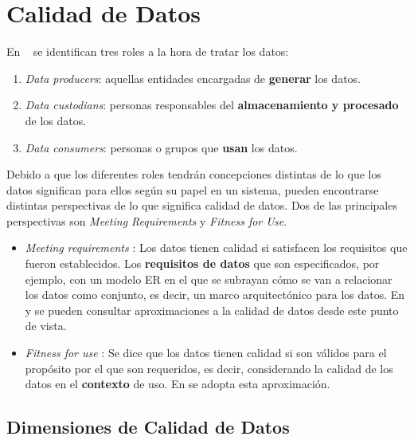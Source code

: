 \section{Calidad de Datos}
\label{sec:dqREF}


En ~\cite{Strong:1997:DQC:253769.253804} se identifican tres roles a
la hora de tratar los datos: 

\begin{enumerate}
\item \textit{Data producers}: aquellas entidades encargadas de \textbf{generar}
  los datos. 
\item \textit{Data custodians}: personas responsables del \textbf{almacenamiento
  y procesado} de los datos. 
\item \textit{Data consumers}: personas o grupos que \textbf{usan} los datos. 
\end{enumerate}


Debido a que los
diferentes roles tendrán concepciones distintas de lo que los datos significan
para ellos según su papel en un sistema, pueden encontrarse distintas
perspectivas de lo que significa calidad de datos. Dos de las
principales perspectivas son \textit{Meeting Requirements} y \textit{Fitness for
  Use}. 

\begin{itemize}
\item{\textit{Meeting requirements} \cite{BPM}: Los datos tienen calidad si
  satisfacen los requisitos que fueron establecidos. Los \textbf{requisitos
    de datos} que son especificados, por ejemplo, con un modelo \acf{ER} en el
  que se subrayan cómo se van a relacionar los datos como conjunto, es decir, un
  marco arquitectónico para los datos. En \cite{conf/ekaw/FurberH10} y
  \cite{Furber:2011:TVD:1966901.1966903} se pueden consultar aproximaciones a la
  calidad de datos desde este punto de vista.}

\item{\textit{Fitness for use} \cite{Strong:1997:DQC:253769.253804}: Se dice que
  los datos tienen calidad si son válidos para el propósito por el que son
  requeridos, es decir, considerando la calidad de los datos en el
  \textbf{contexto} de uso. En \cite{conf/webist/CaballeroVCP08} se adopta esta
  aproximación.}


\end{itemize}


\subsection{Dimensiones de Calidad de Datos}

